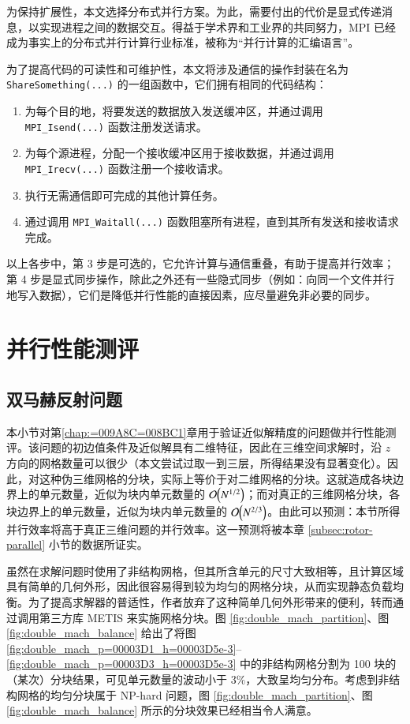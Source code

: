 为保持扩展性，本文选择分布式并行方案。为此，需要付出的代价是显式传递消息，以实现进程之间的数据交互。得益于学术界和工业界的共同努力，MPI
已经成为事实上的分布式并行计算行业标准，被称为“并行计算的汇编语言”。

为了提高代码的可读性和可维护性，本文将涉及通信的操作封装在名为 \texttt{ShareSomething(...)} 的一组函数中，它们拥有相同的代码结构：
\begin{enumerate}[wide]
\item 为每个目的地，将要发送的数据放入发送缓冲区，并通过调用 \texttt{MPI\_Isend(...)} 函数注册发送请求。
\item 为每个源进程，分配一个接收缓冲区用于接收数据，并通过调用 \texttt{MPI\_Irecv(...)} 函数注册一个接收请求。
\item 执行无需通信即可完成的其他计算任务。
\item 通过调用 \texttt{MPI\_Waitall(...)} 函数阻塞所有进程，直到其所有发送和接收请求完成。
\end{enumerate}

以上各步中，第 3 步是可选的，它允许计算与通信重叠，有助于提高并行效率；第 4 步是显式同步操作，除此之外还有一些隐式同步（例如：向同一个文件并行地写入数据），它们是降低并行性能的直接因素，应尽量避免非必要的同步。

\section{并行性能测评}

\subsection{双马赫反射问题}

本小节对第\ref{chap:=009A8C=008BC1}章用于验证近似解精度的问题做并行性能测评。该问题的初边值条件及近似解具有二维特征，因此在三维空间求解时，沿
$z$ 方向的网格数量可以很少（本文尝试过取一到三层，所得结果没有显著变化）。因此，对这种伪三维网格的分块，实际上等价于对二维网格的分块。这就造成各块边界上的单元数量，近似为块内单元数量的
$\order{N^{1/2}}$；而对真正的三维网格分块，各块边界上的单元数量，近似为块内单元数量的 $\order{N^{2/3}}$。由此可以预测：本节所得并行效率将高于真正三维问题的并行效率。这一预测将被本章
\ref{subsec:rotor-parallel} 小节的数据所证实。

虽然在求解问题时使用了非结构网格，但其所含单元的尺寸大致相等，且计算区域具有简单的几何外形，因此很容易得到较为均匀的网格分块，从而实现静态负载均衡。为了提高求解器的普适性，作者放弃了这种简单几何外形带来的便利，转而通过调用第三方库
METIS 来实施网格分块。图 \ref{fig:double_mach_partition}、图
\ref{fig:double_mach_balance} 给出了将图 \ref{fig:double_mach_p=00003D1_h=00003D5e-3}–\ref{fig:double_mach_p=00003D3_h=00003D5e-3}
中的非结构网格分割为 100 块的（某次）分块结果，可见单元数量的波动小于 $3\%$，大致呈均匀分布。考虑到非结构网格的均匀分块属于
NP-hard 问题，图 \ref{fig:double_mach_partition}、图 \ref{fig:double_mach_balance}
所示的分块效果已经相当令人满意。

